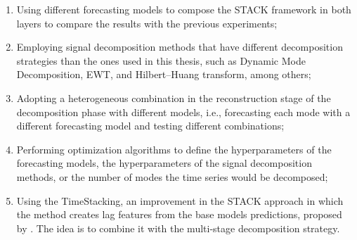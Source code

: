 \begin{enumerate}[label=(\roman*)]
    \item Using different forecasting models to compose the \ac{STACK} framework in both layers to compare the results with the previous experiments;
    \item Employing signal decomposition methods that have different decomposition strategies than the ones used in this thesis, such as Dynamic Mode Decomposition, \ac{EWT}, and Hilbert–Huang transform, among others;
    \item Adopting a heterogeneous combination in the reconstruction stage of the decomposition phase with different models, i.e., forecasting each mode with a different forecasting model and testing different combinations;
    \item Performing optimization algorithms to define the hyperparameters of the forecasting models, the hyperparameters of the signal decomposition methods, or the number of modes the time series would be decomposed;
    \item Using the TimeStacking, an improvement in the \ac{STACK} approach in which the method creates lag features from the base models predictions, proposed by . The idea is to combine it with the multi-stage decomposition strategy.
\end{enumerate}